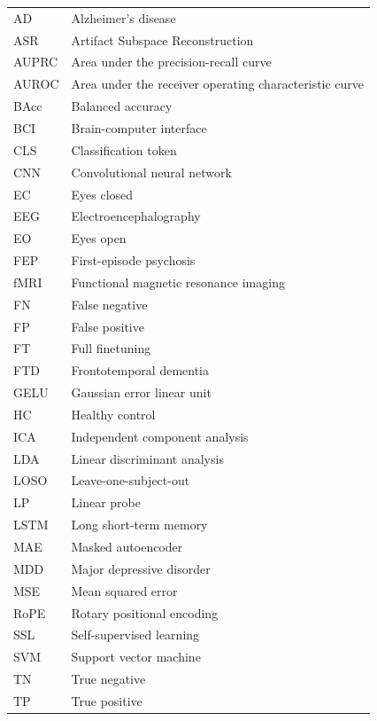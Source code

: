 %


\begin{longtable}{@{}p{}>{\raggedright\arraybackslash}p{}@{}}
  AD    & Alzheimer's disease \\
  ASR   & Artifact Subspace Reconstruction \\
  AUPRC & Area under the precision-recall curve \\
  AUROC & Area under the receiver operating characteristic curve \\
  BAcc  & Balanced accuracy \\
  BCI   & Brain-computer interface \\
  CLS   & Classification token \\
  CNN   & Convolutional neural network \\
  EC    & Eyes closed \\
  EEG   & Electroencephalography \\
  EO    & Eyes open \\
  FEP   & First-episode psychosis \\
  fMRI  & Functional magnetic resonance imaging \\
  FN    & False negative \\
  FP    & False positive \\
  FT    & Full finetuning \\
  FTD   & Frontotemporal dementia \\
  GELU  & Gaussian error linear unit \\
  HC    & Healthy control \\
  ICA   & Independent component analysis \\
  LDA   & Linear discriminant analysis \\
  LOSO  & Leave-one-subject-out \\
  LP    & Linear probe \\
  LSTM  & Long short-term memory \\
  MAE   & Masked autoencoder \\
  MDD   & Major depressive disorder \\
  MSE   & Mean squared error \\
  RoPE  & Rotary positional encoding \\
  SSL   & Self-supervised learning \\
  SVM   & Support vector machine \\
  TN    & True negative \\
  TP    & True positive \\
\end{longtable}

